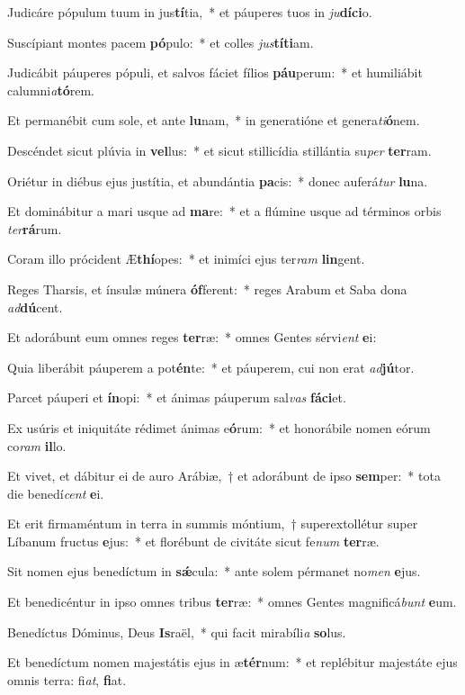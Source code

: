 \item Judicáre pópulum tuum in jus\textbf{tí}tia,~* et páuperes tuos in \textit{ju}\textbf{dí}\textbf{ci}o.
\item Suscípiant montes pacem \textbf{pó}pulo:~* et colles \textit{jus}\textbf{tí}\textbf{ti}am.
\item Judicábit páuperes pópuli, et salvos fáciet fílios \textbf{páu}perum:~* et humiliábit calumni\textit{a}\textbf{tó}rem.
\item Et permanébit cum sole, et ante \textbf{lu}nam,~* in generatióne et genera\textit{ti}\textbf{ó}nem.
\item Descéndet sicut plúvia in \textbf{vel}lus:~* et sicut stillicídia stillántia su\textit{per} \textbf{ter}ram.
\item Oriétur in diébus ejus justítia, et abundántia \textbf{pa}cis:~* donec auferá\textit{tur} \textbf{lu}na.
\item Et dominábitur a mari usque ad \textbf{ma}re:~* et a flúmine usque ad términos orbis \textit{ter}\textbf{rá}rum.
\item Coram illo prócident Æ\textbf{thí}opes:~* et inimíci ejus ter\textit{ram} \textbf{lin}gent.
\item Reges Tharsis, et ínsulæ múnera \textbf{óf}ferent:~* reges Arabum et Saba dona \textit{ad}\textbf{dú}cent.
\item Et adorábunt eum omnes reges \textbf{ter}ræ:~* omnes Gentes sérvi\textit{ent} \textbf{e}i:
\item Quia liberábit páuperem a pot\textbf{én}te:~* et páuperem, cui non erat \textit{ad}\textbf{jú}tor.
\item Parcet páuperi et \textbf{ín}opi:~* et ánimas páuperum sal\textit{vas} \textbf{fá}\textbf{ci}et.
\item Ex usúris et iniquitáte rédimet ánimas e\textbf{ó}rum:~* et honorábile nomen eórum co\textit{ram} \textbf{il}lo.
\item Et vivet, et dábitur ei de auro Arábiæ,~† et adorábunt de ipso \textbf{sem}per:~* tota die benedí\textit{cent} \textbf{e}i.
\item Et erit firmaméntum in terra in summis móntium,~† superextollétur super Líbanum fructus \textbf{e}jus:~* et florébunt de civitáte sicut fe\textit{num} \textbf{ter}ræ.
\item Sit nomen ejus benedíctum in \textbf{sǽ}cula:~* ante solem pérmanet no\textit{men} \textbf{e}jus.
\item Et benedicéntur in ipso omnes tribus \textbf{ter}ræ:~* omnes Gentes magnificá\textit{bunt} \textbf{e}um.
\item Benedíctus Dóminus, Deus \textbf{Is}raël,~* qui facit mirabíli\textit{a} \textbf{so}lus.
\item Et benedíctum nomen majestátis ejus in æ\textbf{tér}num:~* et replébitur majestáte ejus omnis terra: fi\textit{at}, \textbf{fi}at.
